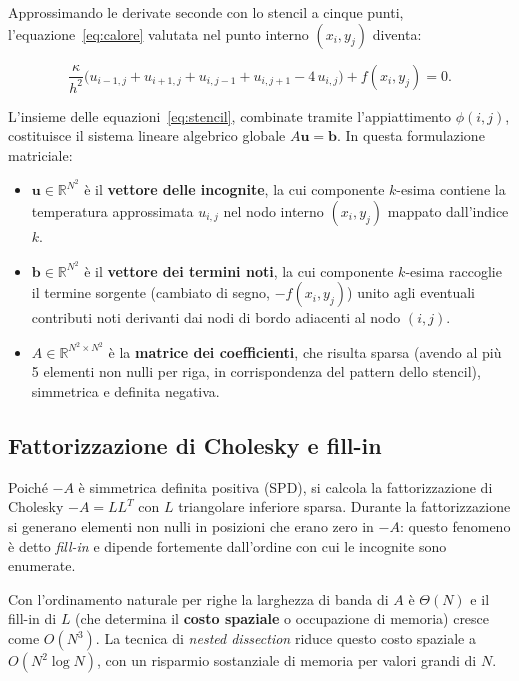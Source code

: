 \documentclass[a4paper,12pt]{article}
\begin{document}
Approssimando le derivate seconde con lo stencil a cinque punti, l'equazione~\eqref{eq:calore} valutata nel punto interno $(x_i, y_j)$ diventa:

\begin{equation}
  \frac{\kappa}{h^2}\bigl(u_{i-1,j} + u_{i+1,j} + u_{i,j-1} + u_{i,j+1} - 4\,u_{i,j}\bigr) + f(x_i,y_j) = 0.
  \label{eq:stencil}
\end{equation}

L'insieme delle equazioni~\eqref{eq:stencil}, combinate tramite l'appiattimento $\phi(i,j)$, costituisce il sistema lineare algebrico globale $A\mathbf{u} = \mathbf{b}$. In questa formulazione matriciale:
\begin{itemize}
    \item $\mathbf{u} \in \mathbb{R}^{N^2}$ è il \textbf{vettore delle incognite}, la cui componente $k$-esima contiene la temperatura approssimata $u_{i,j}$ nel nodo interno $(x_i, y_j)$ mappato dall'indice $k$.
    \item $\mathbf{b} \in \mathbb{R}^{N^2}$ è il \textbf{vettore dei termini noti}, la cui componente $k$-esima raccoglie il termine sorgente (cambiato di segno, $-f(x_i, y_j)$) unito agli eventuali contributi noti derivanti dai nodi di bordo adiacenti al nodo $(i,j)$.
    \item $A \in \mathbb{R}^{N^2 \times N^2}$ è la \textbf{matrice dei coefficienti}, che risulta sparsa (avendo al più 5 elementi non nulli per riga, in corrispondenza del pattern dello stencil), simmetrica e definita negativa.
\end{itemize}

\subsection*{Fattorizzazione di Cholesky e fill-in}

Poiché $-A$ è simmetrica definita positiva (SPD), si calcola la fattorizzazione di Cholesky $-A = LL^T$ con $L$ triangolare inferiore sparsa. Durante la fattorizzazione si generano elementi non nulli in posizioni che erano zero in $-A$: questo fenomeno è detto \emph{fill-in} e dipende fortemente dall'ordine con cui le incognite sono enumerate.

Con l'ordinamento naturale per righe la larghezza di banda di $A$ è $\Theta(N)$ e il fill-in di $L$ (che determina il \textbf{costo spaziale} o occupazione di memoria) cresce come $O(N^3)$. La tecnica di \emph{nested dissection} riduce questo costo spaziale a $O(N^2 \log N)$, con un risparmio sostanziale di memoria per valori grandi di $N$.
\end{document}
